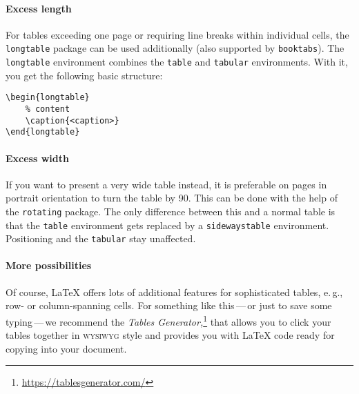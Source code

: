 \paragraph{Excess length}
For tables exceeding one page or requiring line breaks within individual cells,
the \texttt{longtable} package can be used additionally (also supported by \texttt{booktabs}).
The \texttt{longtable} environment combines the \texttt{table} and \texttt{tabular} environments.
With it, you get the following basic structure:

\begin{samepage}
\begin{verbatim}
\begin{longtable}
    % content
    \caption{<caption>}
\end{longtable}
\end{verbatim}
\end{samepage}

\paragraph{Excess width}
If you want to present a very wide table instead, it is preferable on pages in portrait orientation to turn the table by 90\textdegree{}.
This can be done with the help of the \texttt{rotating} package.
The only difference between this and a normal table is that the \texttt{table} environment gets replaced by a \texttt{sidewaystable} environment.
Positioning and the \texttt{tabular} stay unaffected.

\paragraph{More possibilities}
Of course, \LaTeX{} offers lots of additional features for sophisticated tables, e.\,g., row- or column-spanning cells.
For something like this\,---\,or just to save some typing\,---\,we recommend the \emph{Tables Generator}\textit{,}\footnote{\url{https://tablesgenerator.com/}} that allows you to click your tables together in \textsc{wysiwyg} style and provides you with \LaTeX{} code ready for copying into your document.


